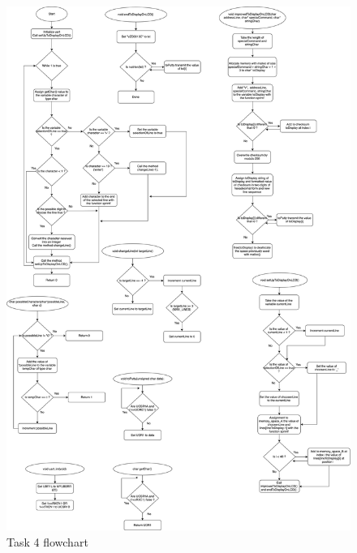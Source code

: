 \documentclass[a4paper,12pt]{article}
\begin{document}
\begin{figure}
\begin{center}
\includegraphics[width=\textwidth/1 ]{flowchart/task4_flowchart.png}
\end{center}
\caption{Task 4 flowchart}
\label{task4}
\end{figure}






\end{document}
